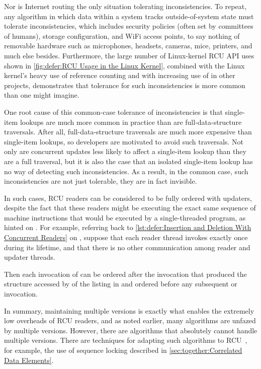 Nor is Internet routing the only situation tolerating inconsistencies.
To repeat, any algorithm in which data within a system tracks
outside-of-system state must tolerate inconsistencies, which includes
security policies (often set by committees of humans), storage configuration,
and WiFi access points, to say nothing of removable hardware such as
microphones, headsets, cameras, mice, printers, and much else besides.
Furthermore, the large number of Linux-kernel RCU API uses shown in
\cref{fig:defer:RCU Usage in the Linux Kernel},
combined with the Linux kernel's heavy use of reference counting
and with increasing use of  in other projects, demonstrates
that tolerance for such inconsistencies is more common than one might
imagine.

One root cause of this common-case tolerance of inconsistencies is
that single-item lookups are much more common in practice than are
full-data-structure traversals.
After all, full-data-structure traversals are much more expensive than
single-item lookups, so developers are motivated to avoid such traversals.
Not only are concurrent updates less likely to affect a single-item
lookup than they are a full traversal, but it is also the case that an
isolated single-item lookup has no way of detecting such inconsistencies.
As a result, in the common case, such inconsistencies are not just
tolerable, they are in fact invisible.

In such cases, RCU readers can be considered to be fully ordered with
updaters, despite the fact that these readers might be executing the
exact same sequence of machine instructions that would be executed by
a single-threaded program, as hinted on
.
For example, referring back to
\cref{lst:defer:Insertion and Deletion With Concurrent Readers}
on ,
suppose that each reader thread invokes  exactly
once during its lifetime, and that there is no other communication among
reader and updater threads.
\begin{fcvref}
Then each invocation of  can be ordered after the
 invocation that produced the  structure
accessed by  of the listing in 
and ordered before any subsequent
 or  invocation.
\end{fcvref}

In summary, maintaining multiple versions is exactly what enables the
extremely low overheads of RCU readers, and as noted earlier, many
algorithms are unfazed by multiple versions.
However, there are algorithms that absolutely cannot handle multiple versions.
There are techniques for adapting such algorithms to
RCU~\cite{PaulEdwardMcKenneyPhD}, for example, the use of sequence locking
described in \cref{sec:together:Correlated Data Elements}.

